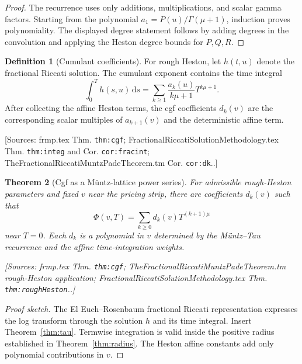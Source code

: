 \documentclass[11pt]{article}
\newtheorem{theorem}{Theorem}[section]
\theoremstyle{definition}
\newtheorem{definition}[theorem]{Definition}
\newcommand{\dd}{\,\mathrm{d}}
\newcommand{\Source}[1]{\par\smallskip\noindent\textup{[Sources: #1.]}}
\begin{document}
\begin{proof}
The recurrence uses only additions,
multiplications,
and scalar gamma factors.
Starting from the polynomial $a_1=P(u)/\Gamma(\mu+1)$,
induction proves polynomiality.
The displayed degree statement follows by adding degrees in the convolution and applying the Heston degree bounds for $P,Q,R$.
\end{proof}

\begin{definition}[Cumulant coefficients]\label{def:cgf-coefficients}
For rough Heston,
let $h(t,u)$ denote the fractional Riccati solution.
The cumulant exponent contains the time integral
\begin{equation}\label{eq:cgf-time-integral}
        \int_0^T h(s,u)\dd s
        =\sum_{k\ge1}\frac{a_k(u)}{k\mu+1}T^{k\mu+1}.
\end{equation}
After collecting the affine Heston terms,
the cgf coefficients $d_k(v)$ are the corresponding scalar multiples of $a_{k+1}(v)$ and the deterministic affine term.
\Source{frmp.tex Thm. \texttt{thm:cgf}; FractionalRiccatiSolutionMethodology.tex Thm. \texttt{thm:integ} and Cor. \texttt{cor:fracint}; TheFractionalRiccatiMuntzPadeTheorem.tm Cor. \texttt{cor:dk}.}
\end{definition}

\begin{theorem}[Cgf as a Müntz-lattice power series]\label{thm:cgf}
For admissible rough-Heston parameters and fixed $v$ near the pricing strip,
there are coefficients $d_k(v)$ such that
\begin{equation}\label{eq:cgf-main}
        \Phi(v,T)=\sum_{k\ge0}d_k(v)T^{(k+1)\mu}
\end{equation}
near $T=0$.
Each $d_k$ is a polynomial in $v$ determined by the Müntz--Tau recurrence and the affine time-integration weights.
\Source{frmp.tex Thm. \texttt{thm:cgf}; TheFractionalRiccatiMuntzPadeTheorem.tm rough-Heston application; FractionalRiccatiSolutionMethodology.tex Thm. \texttt{thm:roughHeston}.}
\end{theorem}

\begin{proof}[Proof sketch]
The El Euch--Rosenbaum fractional Riccati representation expresses the log transform through the solution $h$ and its time integral.
Insert Theorem~\ref{thm:tau}.
Termwise integration is valid inside the positive radius established in Theorem~\ref{thm:radius}.
The Heston affine constants add only polynomial contributions in $v$.
\end{proof}
\end{document}
